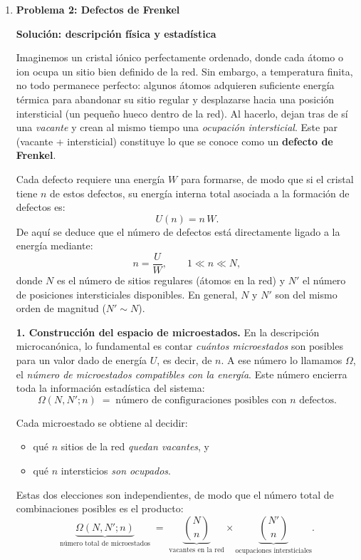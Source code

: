 \documentclass{article}
\begin{document}
\begin{enumerate}[label={{\textcolor{trueblue}{\textbf{Ej}. \arabic*.0}}}, start=2]
\item \textbf{Problema 2: Defectos de Frenkel}

\textcolor{Cinnabar}{\textbf{Solución: descripción física y estadística}}

\vspace{0.6em}
Imaginemos un cristal iónico perfectamente ordenado, donde cada átomo o ion ocupa un sitio bien definido de la red.  
Sin embargo, a temperatura finita, no todo permanece perfecto: algunos átomos adquieren suficiente energía térmica para abandonar su sitio regular y desplazarse hacia una posición intersticial (un pequeño hueco dentro de la red).  
Al hacerlo, dejan tras de sí una \emph{vacante} y crean al mismo tiempo una \emph{ocupación intersticial}.  
Este par (vacante + intersticial) constituye lo que se conoce como un \textbf{defecto de Frenkel}.

Cada defecto requiere una energía \(W\) para formarse, de modo que si el cristal tiene \(n\) de estos defectos, su energía interna total asociada a la formación de defectos es:
\[
U(n) = n\,W.
\]
De aquí se deduce que el número de defectos está directamente ligado a la energía mediante:
\[
n = \frac{U}{W}, \qquad 1 \ll n \ll N,
\]
donde \(N\) es el número de sitios regulares (átomos en la red) y \(N'\) el número de posiciones intersticiales disponibles.  
En general, \(N\) y \(N'\) son del mismo orden de magnitud (\(N' \sim N\)).

\vspace{1em}
\textbf{1. Construcción del espacio de microestados.}  
En la descripción microcanónica, lo fundamental es contar \emph{cuántos microestados} son posibles para un valor dado de energía \(U\), es decir, de \(n\).  
A ese número lo llamamos \(\Omega\), el \emph{número de microestados compatibles con la energía}.  
Este número encierra toda la información estadística del sistema:
\[
\Omega(N, N'; n) \;=\; \text{número de configuraciones posibles con } n \text{ defectos}.
\]

Cada microestado se obtiene al decidir:
\begin{itemize}
  \item qué \(n\) sitios de la red \emph{quedan vacantes}, y
  \item qué \(n\) intersticios \emph{son ocupados}.
\end{itemize}
Estas dos elecciones son independientes, de modo que el número total de combinaciones posibles es el producto:
\[
\underbrace{\Omega(N,N';n)}_{\text{número total de microestados}} \;=\;
\underbrace{\binom{N}{n}}_{\text{vacantes en la red}} \times
\underbrace{\binom{N'}{n}}_{\text{ocupaciones intersticiales}}.
\]


\end{enumerate}
\end{document}
